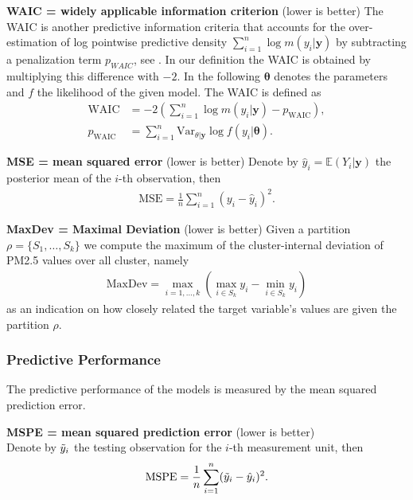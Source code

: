 \documentclass[12pt,a4paper]{article}
\begin{document}
\textbf{WAIC = widely applicable information criterion} (lower is better)
The WAIC is another predictive information criteria that accounts for the over-estimation of log pointwise predictive density $\sum_{i=1}^n \log m(y_i | \mathbf{y})$ by subtracting a penalization term $p_{WAIC}$, see \cite{lecturenotes}. In our definition the WAIC is obtained by multiplying this difference with $-2$. In the following $\mathbf{\theta}$ denotes the parameters and $f$ the likelihood of the given model. The WAIC is defined as
\begin{align*}
    \text{WAIC} &= -2 \left( \sum_{i=1}^n \log m(y_i | \mathbf{y} ) - 
    p_{\text{WAIC}} \right), \\
    p_{\text{WAIC}} &= \sum_{i=1}^n \text{Var}_{\theta | \mathbf{y}} \log 
    f(y_i | \mathbf{\theta} ).
\end{align*}

\textbf{MSE = mean squared error} (lower is better)
Denote by $\hat{y}_i = \mathbb{E}(Y_i | \mathbf{y})$ the posterior mean of the $i$-th observation, then
\begin{align*}
    \text{MSE} = \frac{1}{n} \sum_{i=1}^n (y_i - \hat{y}_i)^2.
\end{align*}

\textbf{MaxDev = Maximal Deviation} (lower is better)
Given a partition $\rho
= \{S_1, \ldots, S_k\}$ we compute the maximum of the cluster-internal 
deviation of PM2.5 values over all cluster, namely
\begin{align*}
    \text{MaxDev} = \max_{i=1, \ldots, k} \left(\max_{i\in S_k} y_i - 
    \min_{i\in S_k} y_i
     \right)
\end{align*}
as an indication on how closely related the target variable's
values are given the partition $\rho$.


\subsubsection{Predictive Performance}
The predictive performance of the models is measured by the mean squared prediction error.

\textbf{MSPE = mean squared prediction error} (lower is better)\\
Denote by $\Tilde{y}_i$ the testing observation for the $i$-th measurement unit, then
\begin{align*}
    \text{MSPE} = \frac{1}{n} \sum_{i=1}^n (\Tilde{y}_i - \hat{y}_i)^2.
\end{align*}
\end{document}
